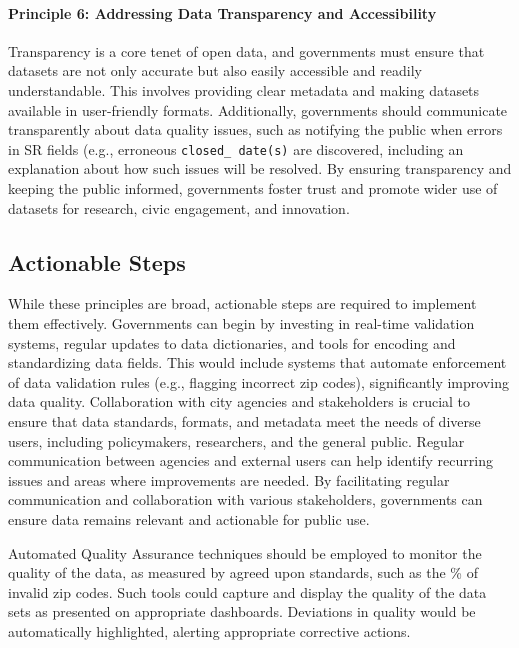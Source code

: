 \documentclass[linenumber]{jdsart}
\begin{document}
\paragraph{Principle 6: Addressing Data Transparency and Accessibility}
Transparency is a core tenet of open data, and governments must ensure 
that datasets are not only accurate but also easily accessible and 
readily understandable. This involves providing clear 
metadata and making datasets available in user\mbox{-}friendly 
formats. Additionally, governments should communicate transparently about 
data quality issues, such as notifying the public when errors in SR 
fields (e.g., erroneous \texttt{closed\_ date(s)} are discovered, including
an explanation about how such issues will be resolved. By 
ensuring transparency and keeping the public informed, 
governments foster trust and promote wider use of datasets 
for research, civic engagement, and innovation.


\subsection{Actionable Steps}
While these principles are broad, actionable steps are required to 
implement them effectively. Governments can begin by investing in 
real\mbox{-}time validation systems, regular updates to data dictionaries, 
and tools for encoding and standardizing data fields. This would include
systems that automate enforcement of data validation rules 
(e.g., flagging incorrect zip codes), significantly improving data 
quality. Collaboration with city agencies and stakeholders is crucial 
to ensure that data standards, formats, and metadata meet the needs 
of diverse users, including policymakers, researchers, and the 
general public. Regular communication between agencies and external 
users can help identify recurring issues and areas where improvements 
are needed. By facilitating regular communication and collaboration 
with various stakeholders, governments can ensure data remains relevant 
and actionable for public use.


Automated Quality Assurance techniques should be employed to 
monitor the quality of the data, as measured by agreed upon
standards, such as the \% of invalid zip codes. Such tools could
capture and display the quality of the data sets as presented
on appropriate dashboards. Deviations in quality would be
automatically highlighted, alerting appropriate corrective actions.
\end{document}
